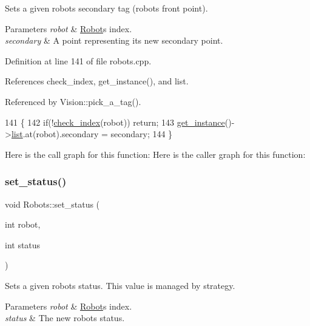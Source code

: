 Sets a given robot\textquotesingle{}s secondary tag (robot\textquotesingle{}s front point). 
\begin{DoxyParams}{Parameters}
{\em robot} & \hyperlink{struct_robots_1_1_robot}{Robot}\textquotesingle{}s index. \\
\hline
{\em secondary} & A point representing it\textquotesingle{}s new secondary point. \\
\hline
\end{DoxyParams}


Definition at line 141 of file robots.\+cpp.



References check\+\_\+index, get\+\_\+instance(), and list.



Referenced by Vision\+::pick\+\_\+a\+\_\+tag().


\begin{DoxyCode}
141                                                            \{
142     \textcolor{keywordflow}{if}(!\hyperlink{robots_8hpp_ae3e6ae8f87cdc750c0b99bc609d9ae43}{check\_index}(robot)) \textcolor{keywordflow}{return};
143     \hyperlink{class_robots_a589bce74db5f34af384952d48435168f}{get\_instance}()->\hyperlink{class_robots_a2c6b77265028f82a4342ca1ef15ed305}{list}.at(robot).secondary = secondary;
144 \}
\end{DoxyCode}
Here is the call graph for this function\+:
Here is the caller graph for this function\+:
\mbox{\label{class_robots_aa287cd821cfe9c6c65fb5cdfd77c5050}} 
\subsubsection{\texorpdfstring{set\+\_\+status()}{set\_status()}}
{\footnotesize\ttfamily void Robots\+::set\+\_\+status (\begin{DoxyParamCaption}\item[{int}]{robot,  }\item[{int}]{status }\end{DoxyParamCaption})\hspace{0.3cm}{\ttfamily [static]}}

Sets a given robot\textquotesingle{}s status. This value is managed by strategy. 
\begin{DoxyParams}{Parameters}
{\em robot} & \hyperlink{struct_robots_1_1_robot}{Robot}\textquotesingle{}s index. \\
\hline
{\em status} & The new robot\textquotesingle{}s status. \\
\hline
\end{DoxyParams}



